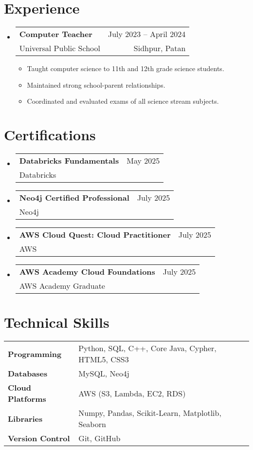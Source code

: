 \documentclass[A4,11pt]{article}
\makeatletter
\newcommand{\CVItem}[1]{
  \item\small{#1 \vspace{-2pt}}
}
\newcommand{\CVSubheading}[4]{
  \vspace{-2pt}\item
    \begin{tabular*}{0.97\textwidth}[t]{l@{\extracolsep{\fill}}r}
      \textbf{#1} & #2 \\
      \small#3 & \small #4 \\
    \end{tabular*}\vspace{-7pt}
}
\newcommand{\CVSubHeadingListStart}{\begin{itemize}[leftmargin=0.5cm, label={}]}
\newcommand{\CVSubHeadingListEnd}{\end{itemize}}
\newcommand{\CVItemListStart}{\begin{itemize}}
\newcommand{\CVItemListEnd}{\end{itemize}\vspace{-5pt}}
\makeatother
\begin{document}
\section{Experience}
  \CVSubHeadingListStart
    \CVSubheading
      {Computer Teacher}{July 2023 -- April 2024}
      {Universal Public School}{Sidhpur, Patan}
      \CVItemListStart
        \CVItem{Taught computer science to 11th and 12th grade science students.}
        \CVItem{Maintained strong school-parent relationships.}
        \CVItem{Coordinated and evaluated exams of all science stream subjects.}
      \CVItemListEnd
  \CVSubHeadingListEnd

\section{Certifications}
  \CVSubHeadingListStart
    \CVSubheading
      {Databricks Fundamentals}{May 2025}
      {Databricks}{}
    \CVSubheading
      {Neo4j Certified Professional}{July 2025}
      {Neo4j}{}
    \CVSubheading
      {AWS Cloud Quest: Cloud Practitioner}{July 2025}
      {AWS}{}
    \CVSubheading
      {AWS Academy Cloud Foundations}{July 2025}
      {AWS Academy Graduate}{}
  \CVSubHeadingListEnd


\section*{Technical Skills}
\hspace{0.4cm}
\begin{tabularx}{\textwidth}{@{}lX@{}}
\textbf{Programming} \hspace{0.7em}     & Python, SQL, C++, Core Java, Cypher, HTML5, CSS3 \\[6pt]
\textbf{Databases} \hspace{0.7em}       & MySQL, Neo4j \\[6pt]
\textbf{Cloud Platforms} \hspace{0.7em} & AWS (S3, Lambda, EC2, RDS) \\[6pt]
\textbf{Libraries} \hspace{0.7em} & Numpy, Pandas, Scikit-Learn, Matplotlib, Seaborn \\[6pt]
\textbf{Version Control} \hspace{0.7em} & Git, GitHub \\[6pt]
\end{tabularx}
\end{document}
